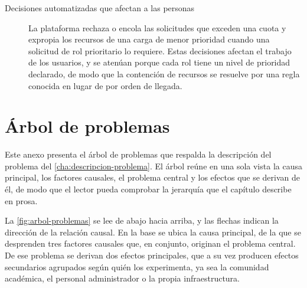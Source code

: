 \begin{description}
  \item[Decisiones automatizadas que afectan a las personas] La plataforma rechaza o encola las solicitudes que exceden una cuota y expropia los recursos de una carga de menor prioridad cuando una solicitud de rol prioritario lo requiere. Estas decisiones afectan el trabajo de los usuarios, y se atenúan porque cada rol tiene un nivel de prioridad declarado, de modo que la contención de recursos se resuelve por una regla conocida en lugar de por orden de llegada.
\end{description}


\chapter{Árbol de problemas}\label{anx:arbol-problemas}

Este anexo presenta el árbol de problemas que respalda la descripción del problema del \cref{cha:descripcion-problema}. El árbol reúne en una sola vista la causa principal, los factores causales, el problema central y los efectos que se derivan de él, de modo que el lector pueda comprobar la jerarquía que el capítulo describe en prosa.

La \cref{fig:arbol-problemas} se lee de abajo hacia arriba, y las flechas indican la dirección de la relación causal. En la base se ubica la causa principal, de la que se desprenden tres factores causales que, en conjunto, originan el problema central. De ese problema se derivan dos efectos principales, que a su vez producen efectos secundarios agrupados según quién los experimenta, ya sea la comunidad académica, el personal administrador o la propia infraestructura.

